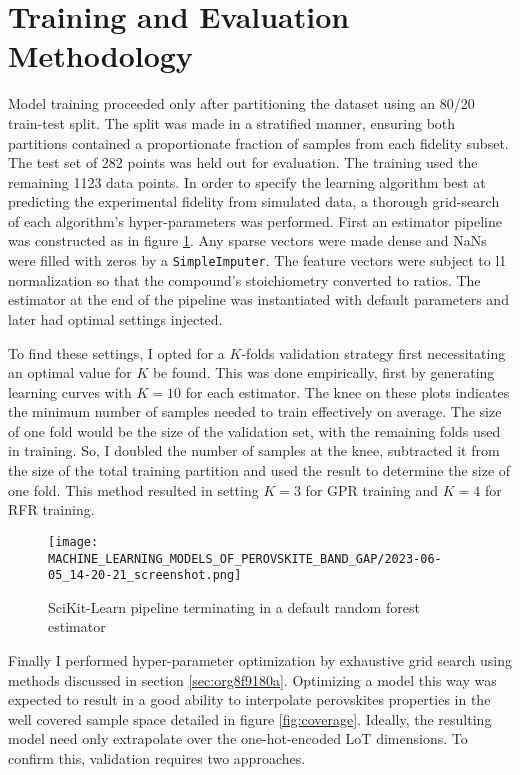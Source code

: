 \section{Training and Evaluation Methodology}
\label{sec:org3f842dd}
Model training proceeded only after partitioning the dataset using an 80/20 train-test split.
The split was made in a stratified manner, ensuring both partitions contained a proportionate fraction of samples from each fidelity subset.
The test set of 282 points was held out for evaluation.
The training used the remaining 1123 data points.
In order to specify the learning algorithm best at predicting the experimental fidelity from simulated data, a thorough grid-search of each algorithm's hyper-parameters was performed.
First an estimator pipeline was constructed as in figure \ref{fig:pipe}.
Any sparse vectors were made dense and NaNs were filled with zeros by a \texttt{SimpleImputer}.
The feature vectors were subject to l1 normalization so that the compound's stoichiometry converted to ratios.
The estimator at the end of the pipeline was instantiated with default parameters and later had optimal settings injected.

To find these settings, I opted for a \(K\)-folds validation strategy first necessitating an optimal value for \(K\) be found.
This was done empirically, first by generating learning curves with \(K=10\) for each estimator.
The knee on these plots indicates the minimum number of samples needed to train effectively on average.
The size of one fold would be the size of the validation set, with the remaining folds used in training.
So, I doubled the number of samples at the knee, subtracted it from the size of the total training partition and used the result to determine the size of one fold.
This method resulted in setting \(K = 3\) for GPR training and \(K = 4\) for RFR training.

\begin{figure}[htbp]
\centering
\texttt{[image: MACHINE\_LEARNING\_MODELS\_OF\_PEROVSKITE\_BAND\_GAP/2023-06-05\_14-20-21\_screenshot.png]}
\caption{\label{fig:pipe} SciKit-Learn pipeline terminating in a default random forest estimator}
\end{figure}

Finally I performed hyper-parameter optimization by exhaustive grid search using methods discussed in section \ref{sec:org8f9180a}.
Optimizing a model this way was expected to result in a good ability to interpolate perovskites properties in the well covered sample space detailed in figure \ref{fig:coverage}.
Ideally, the resulting model need only extrapolate over the one-hot-encoded LoT dimensions.
To confirm this, validation requires two approaches.

